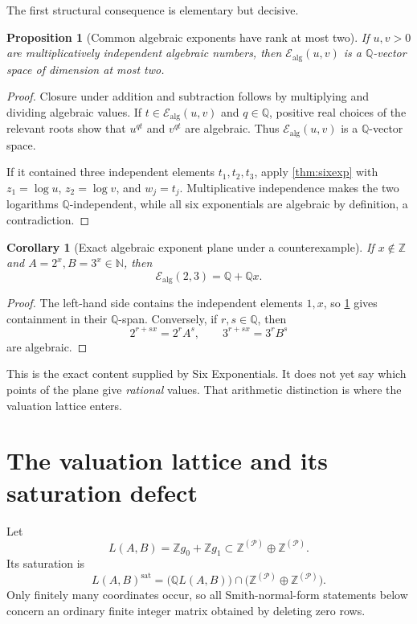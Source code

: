 \documentclass[11pt]{article}
\numberwithin{equation}{section}
\newtheorem{proposition}[theorem]{Proposition}
\newtheorem{corollary}[theorem]{Corollary}
\theoremstyle{definition}
\newcommand{\Q}{\mathbb{Q}}
\newcommand{\Z}{\mathbb{Z}}
\newcommand{\N}{\mathbb{N}}
\newcommand{\sat}{\operatorname{sat}}
\newcommand{\Ealg}{\mathcal E_{\mathrm{alg}}}
\begin{document}
The first structural consequence is elementary but decisive.

\begin{proposition}[Common algebraic exponents have rank at most two]\label{prop:ranktwo}
If \(u,v>0\) are multiplicatively independent algebraic numbers, then \(\Ealg(u,v)\) is a \(\Q\)-vector space of dimension at most two.
\end{proposition}

\begin{proof}
Closure under addition and subtraction follows by multiplying and dividing algebraic values. If \(t\in\Ealg(u,v)\) and \(q\in\Q\), positive real choices of the relevant roots show that \(u^{qt}\) and \(v^{qt}\) are algebraic. Thus \(\Ealg(u,v)\) is a \(\Q\)-vector space.

If it contained three independent elements \(t_1,t_2,t_3\), apply \cref{thm:sixexp} with \(z_1=\log u\), \(z_2=\log v\), and \(w_j=t_j\). Multiplicative independence makes the two logarithms \(\Q\)-independent, while all six exponentials are algebraic by definition, a contradiction.
\end{proof}

\begin{corollary}[Exact algebraic exponent plane under a counterexample]\label{cor:Ealgplane}
If \(x\notin\Z\) and \(A=2^x,B=3^x\in\N\), then
\[
       \Ealg(2,3)=\Q+\Q x.
\]
\end{corollary}

\begin{proof}
The left-hand side contains the independent elements \(1,x\), so \cref{prop:ranktwo} gives containment in their \(\Q\)-span. Conversely, if \(r,s\in\Q\), then
\[
  2^{r+sx}=2^rA^s,\qquad 3^{r+sx}=3^rB^s
\]
are algebraic.
\end{proof}

This is the exact content supplied by Six Exponentials. It does not yet say which points of the plane give \emph{rational} values. That arithmetic distinction is where the valuation lattice enters.

\section{The valuation lattice and its saturation defect}

Let
\[
   L(A,B)=\Z g_0+\Z g_1
   \subset \Z^{(\mathcal P)}\oplus\Z^{(\mathcal P)}.
\]
Its saturation is
\[
  L(A,B)^{\sat}
  =\bigl(\Q L(A,B)\bigr)\cap
       \bigl(\Z^{(\mathcal P)}\oplus\Z^{(\mathcal P)}\bigr).
\]
Only finitely many coordinates occur, so all Smith-normal-form statements below concern an ordinary finite integer matrix obtained by deleting zero rows.
\end{document}
